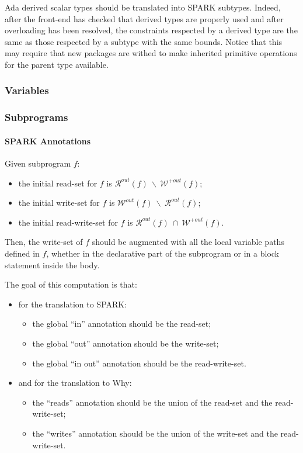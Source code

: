\documentclass{article}
\newcommand{\outallwrites}[1]{\ensuremath{\mathcal{W}^{+out}(#1)}\xspace}
\newcommand{\outwrites}[1]{\ensuremath{\mathcal{W}^{out}(#1)}\xspace}
\newcommand{\outreads}[1]{\ensuremath{\mathcal{R}^{out}(#1)}\xspace}
\newcommand{\inter}{~\cap~}
\newcommand{\minus}{~\backslash~}
\begin{document}
Ada derived scalar types should be translated into SPARK subtypes. Indeed,
after the front-end has checked that derived types are properly used and after
overloading has been resolved, the constraints respected by a derived type are
the same as those respected by a subtype with the same bounds. Notice that this
may require that new packages are withed to make inherited primitive operations
for the parent type available.

\subsubsection{Variables}
\subsubsection{Subprograms}

\paragraph{SPARK Annotations}

Given subprogram $f$:
\begin{itemize}
\item the initial read-set for $f$ is $\outreads{f} \minus \outallwrites{f}$;
\item the initial write-set for $f$ is $\outwrites{f} \minus \outreads{f}$;
\item the initial read-write-set for $f$ is $\outreads{f} \inter
  \outallwrites{f}$.
\end{itemize}

Then, the write-set of $f$ should be augmented with all the local variable paths
defined in $f$, whether in the declarative part of the subprogram or in a block
statement inside the body.

The goal of this computation is that:
\begin{itemize}
\item for the translation to SPARK:
\begin{itemize}
\item the global ``in'' annotation should be the read-set;
\item the global ``out'' annotation should be the write-set;
\item the global ``in out'' annotation should be the read-write-set.
\end{itemize}
\item and for the translation to Why:
\begin{itemize}
\item the ``reads'' annotation should be the union of the read-set and the
  read-write-set;
\item the ``writes'' annotation should be the union of the write-set and the
  read-write-set.
\end{itemize}
\end{itemize}
\end{document}
